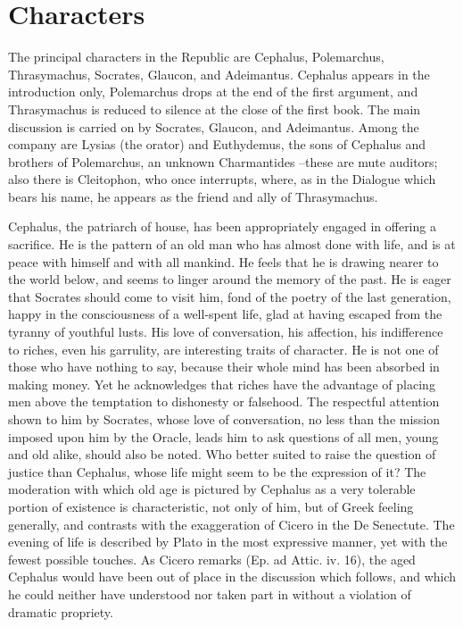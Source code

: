 \section{Characters}

The principal characters in the Republic are Cephalus, Polemarchus, Thrasymachus, Socrates, Glaucon, and Adeimantus. Cephalus appears in the introduction only, Polemarchus drops at the end of the first argument, and Thrasymachus is reduced to silence at the close of the first book. The main discussion is carried on by Socrates, Glaucon, and Adeimantus. Among the company are Lysias (the orator) and Euthydemus, the sons of Cephalus and brothers of Polemarchus, an unknown Charmantides --these are mute auditors; also there is Cleitophon, who once interrupts, where, as in the Dialogue which bears his name, he appears as the friend and ally of Thrasymachus.

Cephalus, the patriarch of house, has been appropriately engaged in offering a sacrifice. He is the pattern of an old man who has almost done with life, and is at peace with himself and with all mankind. He feels that he is drawing nearer to the world below, and seems to linger around the memory of the past. He is eager that Socrates should come to visit him, fond of the poetry of the last generation, happy in the consciousness of a well-spent life, glad at having escaped from the tyranny of youthful lusts. His love of conversation, his affection, his indifference to riches, even his garrulity, are interesting traits of character. He is not one of those who have nothing to say, because their whole mind has been absorbed in making money. Yet he acknowledges that riches have the advantage of placing men above the temptation to dishonesty or falsehood. The respectful attention shown to him by Socrates, whose love of conversation, no less than the mission imposed upon him by the Oracle, leads him to ask questions of all men, young and old alike, should also be noted. Who better suited to raise the question of justice than Cephalus, whose life might seem to be the expression of it? The moderation with which old age is pictured by Cephalus as a very tolerable portion of existence is characteristic, not only of him, but of Greek feeling generally, and contrasts with the exaggeration of Cicero in the De Senectute. The evening of life is described by Plato in the most expressive manner, yet with the fewest possible touches. As Cicero remarks (Ep. ad Attic. iv. 16), the aged Cephalus would have been out of place in the discussion which follows, and which he could neither have understood nor taken part in without a violation of dramatic propriety.

